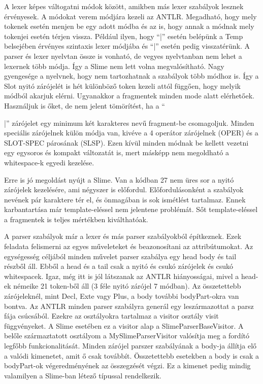 A lexer képes váltogatni módok között, amikben más lexer szabályok lesznek érvényesek. 
A módokat verem módjára kezeli az ANTLR. 
Megadható, hogy mely tokenek esetén menjen be egy adott módba és az is, hogy annak a módnak mely tokenjei esetén térjen vissza. 
Például ilyen, hogy “{|” esetén belépünk a Temp belsejében érvényes szintaxis lexer módjába és “|}” esetén pedig visszatérünk. 
A parser és lexer nyelvtan össze is vonható, de vegyes nyelvtanban nem lehet a lexernek több módja.
Így a Slime nem lett volna megvalósítható.
Nagy gyengesége a nyelvnek, hogy nem tartozhatnak a szabályok több módhoz is. 
Így a Slot nyitó zárójelét is hét különböző token kezeli attól függően, hogy melyik módból akarjuk elérni. 
Ugyanakkor a fragmentek  minden mode alatt elérhetőek. 
Használjuk is őket, de nem jelent tömörítést, ha a “{|” zárójelet egy minimum két karakteres nevű fragment-be csomagoljuk. 
Minden speciális zárójelnek külön módja van, kivéve a 4 operátor zárójelnek (OPER) és a SLOT-SPEC párosának (SLSP). 
Ezen kívül minden módnak be kellett vezetni egy egysoros és kompakt változatát is, mert másképp nem megoldható a whitespace-k egyedi kezelése.

Erre is jó megoldást nyújt a Slime. 
Van a kódban 27 nem üres sor a nyitó zárójelek kezelésére, ami négyszer is előfordul.
Előfordulásonként a szabályok nevének pár karaktere tér el, és önmagában is sok ismétlést tartalmaz. 
Ennek karbantartása már template-eléssel nem jelentene problémát. 
Sőt template-eléssel a fragmentek is teljes mértékben kiválthatóak.

A parser szabályok már a lexer és más parser szabályokból építkeznek. 
Ezek feladata felismerni az egyes műveleteket és beazonosítani az attribútumokat. 
Az egységesség céljából minden művelet parser szabálya egy head body és tail részből áll.
Ebből a head és a tail csak a nyitó és csukó zárójelek és csukó whitespacek. 
Igaz, még itt is jól látszanak az ANTLR hiányosságai, mivel a head-ek némeike 21 token-ből áll (3 féle nyitó zárójel 7 módban). 
Az összetettebb zárójeleknél, mint Decl, Exte vagy Plus, a body további bodyPart-okra van bontva. 
Az ANTLR minden parser szabályra generál egy leszármazottat a parsz fája csúcsából. 
Ezekre az osztályokra tartalmaz a visitor osztály visit függvényeket. 
A Slime esetében ez a visitor alap a SlimeParserBaseVisitor.
A belőle származtatott osztályom a MySlimeParserVisitor valósítja meg a fordító legfőbb funkcionalitását. 
Minden zárójel parszer szabályának a body-ja állítja elő a valódi kimenetet, amit ő csak továbbít. 
Összetettebb esetekben a body is csak a bodyPart-ok végeredményének az összegzését végzi. 
Ez a kimenet pedig mindig valamilyen a Slime-ban létező típussal rendelkezik.

}
